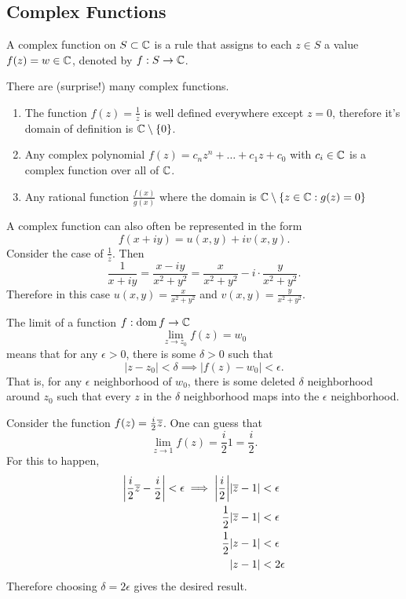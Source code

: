 \documentclass[../notes.tex]{subfiles}
\begin{document}

\subsection{Complex Functions}

\begin{definition}
    A complex function on $S \subset \mathbb{C}$ is a rule that assigns to each $z \in S$ a value $f(z) = w \in \mathbb{C}$, denoted by $f : S \to \mathbb{C}$.
\end{definition}

\begin{example}
    There are (surprise!) many complex functions.
    \begin{enumerate}
        \item The function $f(z) = \frac{1}{z}$ is well defined everywhere except $z = 0$, therefore it's domain of definition is $\mathbb{C} \setminus \qty{0}$.
        \item Any complex polynomial $f(z) = c_n z^n + \ldots + c_1 z + c_0$ with $c_i \in \mathbb{C}$ is a complex function over all of $\C$.
        \item Any rational function $\frac{f(x)}{g(x)}$ where the domain is $\mathbb{C} \setminus \qty{z \in \mathbb{C}: g(z) = 0}$
    \end{enumerate}
\end{example}

A complex function can also often be represented in the form
\[
    f(x+iy) = u(x,y) + i v(x, y)
.\]
Consider the case of $\frac{1}{z}$. Then
\[
    \frac{1}{x+iy} = \frac{x-iy}{x^2+y^2} = \frac{x}{x^2+y^2} - i \cdot \frac{y}{x^2+y^2}
.\]
Therefore in this case $u(x,y) = \frac{x}{x^2+y^2}$ and $v(x,y) = \frac{y}{x^2+y^2}$.

\begin{definition}[Limits in $\C$]
    The limit of a function $f:\operatorname{dom} f \to \mathbb{C}$
    \[
        \lim_{z \to z_0} f(z) = w_0
    \]
    means that for any $\epsilon > 0$, there is some $\delta > 0$ such that
    \[
        |z-z_0| < \delta \implies |f(z) - w_0| < \epsilon
    .\]
    That is, for any $\epsilon$ neighborhood of $w_0$, there is some deleted $\delta$ neighborhood around $z_0$ such that every $z$ in the $\delta$ neighborhood maps into the $\epsilon$ neighborhood.
\end{definition}

\begin{example}
    Consider the function $f(z) = \frac{i}{2} \overline{z}$. One can guess that
    \[
        \lim_{z \to 1} f(z) = \frac{i}{2} 1 = \frac{i}{2}
    .\]
    For this to happen,
    \begin{align*}
        \qty|\frac{i}{2} \overline{z} - \frac{i}{2}| < \epsilon \implies \qty|\frac{i}{2}| |\overline{z} - 1| &< \epsilon \\
        \frac{1}{2} |\overline{z} - 1| &< \epsilon \\
        \frac{1}{2} |z - 1| &< \epsilon \\
        |z - 1| &< 2 \epsilon
    \end{align*}
    Therefore choosing $\delta = 2 \epsilon$ gives the desired result.
\end{example}
\end{document}
